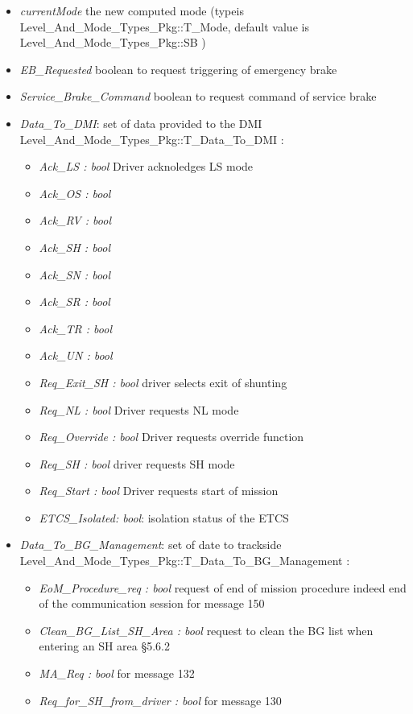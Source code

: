 \begin{itemize}
\item \emph{currentMode} the new computed mode (typeis  Level\_And\_Mode\_Types\_Pkg::T\_Mode, default value is Level\_And\_Mode\_Types\_Pkg::SB )
\item \emph{EB\_Requested} boolean to request triggering of emergency brake 	  	
\item \emph{Service\_Brake\_Command} boolean to request command of service brake 	  	
\item \emph{Data\_To\_DMI}: set of data provided to the DMI	Level\_And\_Mode\_Types\_Pkg::T\_Data\_To\_DMI 	:  	
\begin{itemize}
\item \emph{Ack\_LS : bool} Driver acknoledges LS mode
\item \emph{Ack\_OS : bool}
\item \emph{Ack\_RV : bool}
\item \emph{Ack\_SH : bool}
\item \emph{Ack\_SN : bool}
\item \emph{Ack\_SR : bool}
\item \emph{Ack\_TR : bool}
\item \emph{Ack\_UN : bool}
\item \emph{Req\_Exit\_SH : bool} driver selects exit of shunting
\item \emph{Req\_NL : bool} Driver requests NL mode
\item \emph{Req\_Override : bool} Driver requests override function
\item \emph{Req\_SH : bool} driver requests SH mode
\item \emph{Req\_Start : bool} Driver requests start of mission
\item \emph{ETCS\_Isolated: bool}: isolation status of the ETCS
\end{itemize}
\item \emph{Data\_To\_BG\_Management}: set of date to trackside Level\_And\_Mode\_Types\_Pkg::T\_Data\_To\_BG\_Management 	: 
\begin{itemize}
\item \emph{EoM\_Procedure\_req : bool} request of end of mission procedure indeed end of the communication session for message 150
\item \emph{Clean\_BG\_List\_SH\_Area : bool} request to clean the BG  list when entering  an SH area §5.6.2
\item \emph{MA\_Req : bool} for message 132
\item \emph{Req\_for\_SH\_from\_driver : bool} for message 130
\end{itemize}
\end{itemize}


